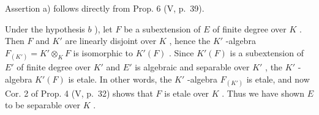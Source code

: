 Assertion a) follows directly from Prop. 6 (V, p.~39).

Under the hypothesis \(b\) ), let \(F\) be a subextension of \(E\) of finite degree over \(K\) . Then \(F\) and \(K'\) are linearly disjoint over \(K\) , hence the \(K'\) -algebra \(F_{(K')} = K' \otimes_K F\) is isomorphic to \(K'(F)\) . Since \(K'(F)\) is a subextension of \(E'\) of finite degree over \(K'\) and \(E'\) is algebraic and separable over \(K'\) , the \(K'\) -algebra \(K'(F)\) is etale. In other words, the \(K'\) -algebra \(F_{(K')}\) is etale, and now Cor. 2 of Prop. 4 (V, p.~32) shows that \(F\) is etale over \(K\) . Thus we have shown \(E\) to be separable over \(K\) .
\relax{}
